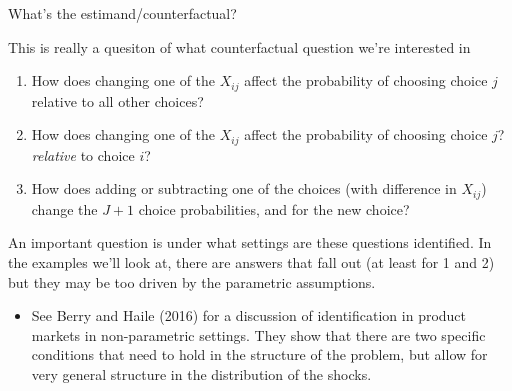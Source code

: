 \documentclass[notes,11pt, aspectratio=169]{beamer}
\newenvironment{wideitemize}{\itemize\addtolength{\itemsep}{10pt}}{\enditemize}
\begin{document}
\begin{frame}{What's the estimand/counterfactual? }
  \begin{wideitemize}
  \item   This is really a quesiton of what counterfactual question we're interested in
    \begin{enumerate}
  \item How does changing one of the $X_{ij}$ affect the probability
    of choosing choice $j$ relative to all other choices?
  \item How does changing one of the $X_{ij}$ affect the probability
    of choosing choice $j$? \emph{relative} to choice $i$?
  \item How does adding or subtracting one of the choices (with
    difference in $X_{ij}$) change the $J+1$ choice probabilities,
    and for the new choice?
  \end{enumerate}
\item An important question is under what settings are these questions
  identified. In the examples we'll look at, there are answers that
  fall out (at least for 1 and 2) but they may be too driven by the
  parametric assumptions.
  \begin{itemize}
  \item See Berry and Haile (2016) for a discussion of identification
    in product markets in non-parametric settings. They show that
    there are two specific conditions that need to hold in the
    structure of the problem, but allow for very general structure in
    the distribution of the shocks.
  \end{itemize}
  \end{wideitemize}
\end{frame}
\end{document}
